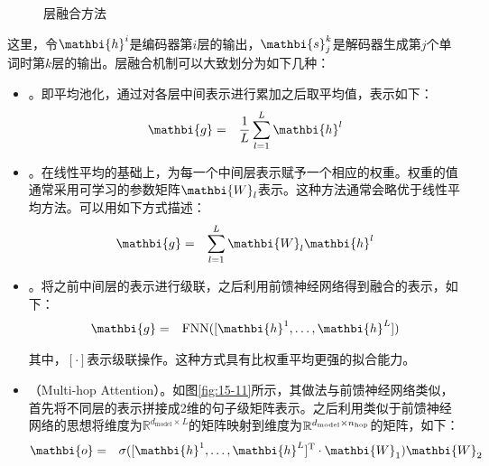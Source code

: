 \begin{figure}[htp]
\centering

\caption{层融合方法}
\label{fig:15-10}
\end{figure}

\parinterval 这里，令$\mathbi{h}^i$是编码器第$i$层的输出，$\mathbi{s}^k_{j}$是解码器生成第$j$个单词时第$k$层的输出。层融合机制可以大致划分为如下几种：

\begin{itemize}
\vspace{0.5em}
\item {\small{}}。即平均池化，通过对各层中间表示进行累加之后取平均值，表示如下：
\begin{eqnarray}
\mathbi{g} &=& \frac{1}{L}\sum_{l=1}^{L}{\mathbi{h}^l}
\label{eq:15-30}
\end{eqnarray}

\vspace{0.5em}
\item {\small{}}。在线性平均的基础上，为每一个中间层表示赋予一个相应的权重。权重的值通常采用可学习的参数矩阵$\mathbi{W}_l$表示。这种方法通常会略优于线性平均方法。可以用如下方式描述：
\begin{eqnarray}
\mathbi{g} &=& \sum_{l=1}^{L}{\mathbi{W}_l\mathbi{h}^l}
\label{eq:15-31}
\end{eqnarray}

\vspace{0.5em}
\item {\small{}}。将之前中间层的表示进行级联，之后利用前馈神经网络得到融合的表示，如下：
\begin{eqnarray}
\mathbi{g} &=& \textrm{FNN}([\mathbi{h}^1,\ldots,\mathbi{h}^L])
\label{eq:15-32}
\end{eqnarray}

\noindent 其中，$[\cdot]$表示级联操作。这种方式具有比权重平均更强的拟合能力。
\vspace{0.5em}
\item {\small{}}（Multi-hop Attention）。如图\ref{fig:15-11}所示，其做法与前馈神经网络类似，首先将不同层的表示拼接成2维的句子级矩阵表示。之后利用类似于前馈神经网络的思想将维度为$\mathbb{R}^{d_{\textrm{model}} \times L}$的矩阵映射到维度为$\mathbb{R}^{d_{\textrm{model}} \times n_{\rm hop}}$的矩阵，如下：
\begin{eqnarray}
\mathbi{o} &=& \sigma ([\mathbi{h}^1,\ldots,\mathbi{h}^L]^{\textrm{T}} \cdot \mathbi{W}_1)\mathbi{W}_2
\label{eq:15-33}
\end{eqnarray}


\end{itemize}
